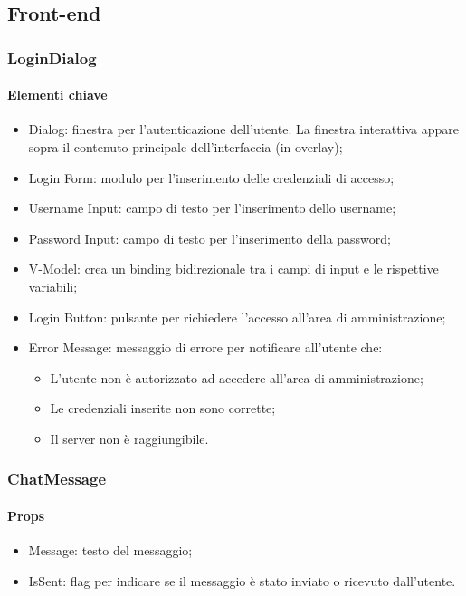 \subsection{Front-end}

\subsubsection{LoginDialog}

\paragraph*{Elementi chiave}
\begin{itemize}
  \item Dialog: finestra per l'autenticazione dell'utente. La finestra interattiva appare sopra il contenuto principale dell'interfaccia (in overlay);
  \item Login Form: modulo per l'inserimento delle credenziali di accesso;
  \item Username Input: campo di testo per l'inserimento dello username;
  \item Password Input: campo di testo per l'inserimento della password;
  \item V-Model: crea un binding bidirezionale tra i campi di input e le rispettive variabili;
  \item Login Button: pulsante per richiedere l'accesso all'area di amministrazione;
  \item Error Message: messaggio di errore per notificare all'utente che:
  \begin{itemize}
    \item L'utente non è autorizzato ad accedere all'area di amministrazione;
    \item Le credenziali inserite non sono corrette;
    \item Il server non è raggiungibile.
  \end{itemize}
\end{itemize}

\subsubsection{ChatMessage}

\paragraph*{Props}
\begin{itemize}
  \item Message: testo del messaggio;
  \item IsSent: flag per indicare se il messaggio è stato inviato o ricevuto dall'utente.
\end{itemize}

